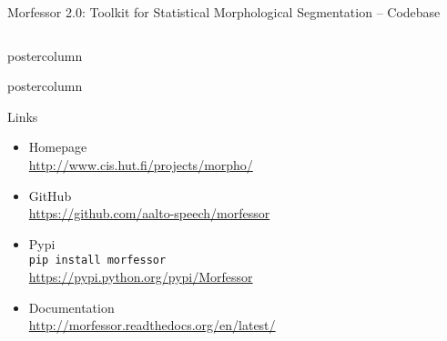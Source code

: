 \documentclass[final]{beamer} %
\begin{document}
\begin{frame}{Morfessor 2.0: Toolkit for Statistical Morphological Segmentation -- Codebase}
\begin{columns}
\begin{column}{.35\textwidth}
\begin{beamercolorbox}[center,wd=\textwidth]{postercolumn}
\begin{block}{}
            \end{block}
            
	\end{beamercolorbox}



	  \begin{beamercolorbox}[center,wd=\textwidth]{postercolumn}
	 \begin{block}{Links}
	              \begin{itemize}
			\item Homepage \\
	                \url{http://www.cis.hut.fi/projects/morpho/}

	\item GitHub\\
\url{https://github.com/aalto-speech/morfessor} 


	              \item Pypi\\ \texttt{pip install morfessor} \\
\url{https://pypi.python.org/pypi/Morfessor} 


	              \item Documentation 
	                \\ {\small \url{http://morfessor.readthedocs.org/en/latest/} }
	                
%	
%			
%	
	              \end{itemize}              
	            \end{block}
	            
		\end{beamercolorbox}








\end{column}

\end{columns}
 \end{frame}



  
\end{document}
